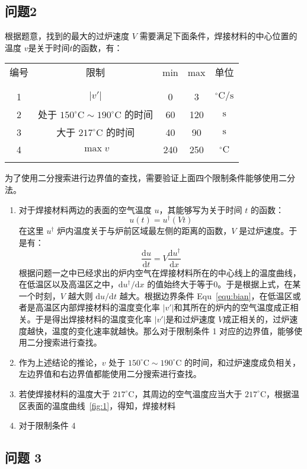 \documentclass[../main.tex]{subfiles}
\begin{document}
\subsection{问题2}
根据题意，找到的最大的过炉速度 \(V\) 需要满足下面条件，焊接材料的中心位置的温度 \(v\)是关于时间\(t\)的函数，有：

\begin{table}[H]
\centering
\begin{tabular}{ccccc}
编号&限制 & min & max 	& 单位
\\ [-1em]
\\ \hline \hline
\\ [-1em]
1&\(\vert v '\vert\) & 0 & 3 & \(^{\circ}\mathrm{C} / \mathrm{s}\)\\
2&处于 \(150 ^{\circ}\mathrm{C}\sim 190 ^{\circ}\mathrm{C}\) 的时间 & 60 & 120 & \(\mathrm{s}\)\\
3&大于 \(217 ^{\circ}\mathrm{C}\) 的时间 & 40 & 90 & \(\mathrm{s}\)\\
4&\(\max {v}\) & 240 & 250 & \(^{\circ}\mathrm{C}\) 
\\ [-1em]
\\ \hline
\end{tabular}
\end{table}
为了使用二分搜索进行边界值的查找，需要验证上面四个限制条件能够使用二分法。
\begin{enumerate}
\item 
对于焊接材料两边的表面的空气温度 \(u\)，其能够写为关于时间 \(t\) 的函数：
\[
u (t) = u^{\dagger} ( Vt)
\]
在这里 \(u ^{\dagger}\) 炉内温度关于与炉前区域最左侧的距离的函数，\(V\) 是过炉速度。于是有：
\begin{equation}
\frac{\mathrm{d} u}{\mathrm{d} t} = V \frac{\mathrm{d} u ^{\dagger}}{\mathrm{d} x}
\end{equation}
根据问题一之中已经求出的炉内空气在焊接材料所在的中心线上的温度曲线，在低温区以及高温区之中，\(\mathrm{d} u ^{\dagger}/ \mathrm{d} x\) 的值始终大于等于\(0\)。于是根据上式，在某一个时刻，\(V\) 越大则 \(\mathrm{d} u / \mathrm{d} t\) 越大。根据边界条件 Equ~\ref{equ:bian}，在低温区或者是高温区内部焊接材料的温度变化率 \(\vert v' \vert\)和其所在的炉内的空气温度成正相关。于是得出焊接材料的温度变化率 \(\vert v'\vert\)是和过炉速度 \(V\)成正相关的，过炉速度越快，温度的变化速率就越快。那么对于限制条件 1 对应的边界值，能够使用二分搜索进行查找。

\item 
作为上述结论的推论，\(v\) 处于 \(150 ^{\circ}\mathrm{C}\sim 190 ^{\circ}\mathrm{C}\) 的时间，和过炉速度成负相关，左边界值和右边界值都能使用二分搜索进行查找。

\item 
若使焊接材料的温度大于 \(217 ^{\circ}\mathrm{C}\)，其周边的空气温度应当大于 \(217 ^{\circ}\mathrm{C}\)，根据温区表面的温度曲线~\ref{fig:1}，得知，焊接材料
\item
对于限制条件 4 
\end{enumerate}

\subsection{问题 3}
\end{document}

